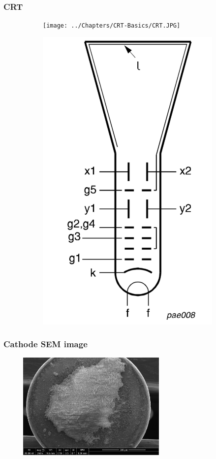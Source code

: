 \documentclass[aspectratio=169]{beamer}
\begin{document}

\begin{frame}
	\frametitle{CRT}
	\begin{figure}
		\centering
		\begin{subfigure}{.4\textwidth}
			\centering
			\texttt{[image: ../Chapters/CRT-Basics/CRT.JPG]}
		\end{subfigure}%
		\begin{subfigure}{.4\textwidth}
			\centering
			\includegraphics[width=.65\textwidth]{../Chapters/CRT-Basics/electrode configuration.png}
		\end{subfigure}
	\end{figure}
\end{frame}


\begin{frame}
	\frametitle{Cathode SEM image}
	\begin{figure}
		\centering
		\includegraphics[width=0.65\textwidth]{../Chapters/CRT-Basics/SEM_image.png}
	\end{figure}
\end{frame}
\end{document}
